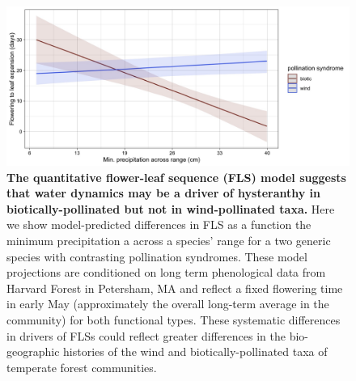 \documentclass[12pt]{article}
\begin{document}
 \begin{figure}[h!] 
        \centering
          \includegraphics[width=\textwidth]{..//HarvardForest/apcs.jpeg}
           \caption{\textbf{The quantitative flower-leaf sequence (FLS) model suggests that water dynamics may be a driver of hysteranthy in biotically-pollinated but not in wind-pollinated taxa.} Here we show model-predicted differences in FLS as a function the minimum precipitation a across a species' range for a two generic species with contrasting pollination syndromes. These model projections are conditioned on long term phenological data from Harvard Forest in Petersham, MA \citep{OKeefe2015} and reflect a fixed flowering time in early May (approximately the overall long-term average in the community) for both functional types. These systematic differences in drivers of FLSs could reflect greater differences in the bio-geographic histories of the wind and biotically-pollinated taxa of temperate forest communities.}
        \label{fig:apcs}
    \end{figure}


    
\end{document}
